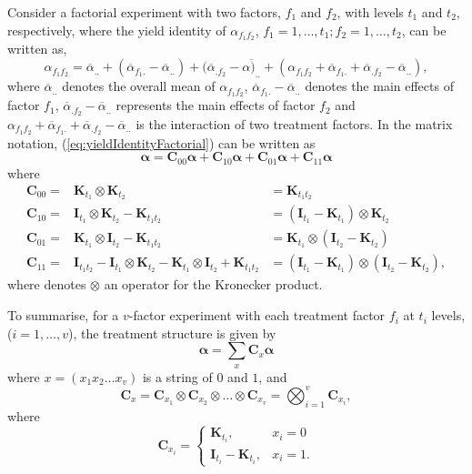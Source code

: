 \documentclass[article]{jss}
\newcommand{\I}{\mathbf{I}}
\newcommand{\K}{\mathbf{K}}
\newcommand{\C}{\mathbf{C}}
\begin{document}
Consider a factorial experiment with two factors, $f_1$ and $f_2$, with levels $t_1$ and $t_2$, respectively, where the yield identity of $\alpha_{f_1 f_2}$, $f_1= 1,\dots, t_1; f_2 = 1,\dots,t_2$, can be written as,
\begin{equation}
\label{eq:yieldIdentityFactorial}
\alpha_{f_1 f_2} = \overline{\alpha}_{..}+(\overline{\alpha}_{f_1 .} -\overline{\alpha}_{..}) + (\overline{\alpha}_{.f_2} -\overline{\alpha)_{..}} +(\alpha_{f_1 f_2} + \overline{\alpha}_{f_1 .} + \overline{\alpha}_{.f_2} -\overline{\alpha}_{..}),
\end{equation}
where $\overline{\alpha}_{..}$ denotes the overall mean of $\alpha_{f_1 f_2}$, $\overline{\alpha}_{f_1.} -\overline{\alpha}_{..}$ denotes the main effects of factor $f_1$, $\overline{\alpha}_{.f_2} -\overline{\alpha}_{..}$ represents the main effects of factor $f_2$ and $\alpha_{f_1 f_2} + \overline{\alpha}_{f_1.} + \overline{\alpha}_{. f_2} -\overline{\alpha}_{..}$ is the interaction of two treatment factors. In the matrix notation, (\ref{eq:yieldIdentityFactorial}) can be written as
\[
\bm{\alpha} =  \C_{00} \bm{\alpha} +   \C_{10} \bm{\alpha} +   \C_{01} \bm{\alpha} +   \C_{11} \bm{\alpha} 
\]
where
\begin{eqnarray}
\nonumber \C_{00} = & \K_{t_1} \otimes \K_{t_2}& = \K_{t_1 t_2}\\
\nonumber \C_{10} = & \I_{t_1} \otimes \K_{t_2} - \K_{t_1 t_2}& = (\I_{t_1} - \K_{t_1}) \otimes \K_{t_2} \\
\nonumber \C_{01} = &\K_{t_1} \otimes \I_{t_2} - \K_{t_1 t_2}& =  \K_{t_1} \otimes (\I_{t_2} - \K_{t_2})\\
\nonumber \C_{11} = &\I_{t_1 t_2}-\I_{t_1} \otimes \K_{t_2} - \K_{t_1} \otimes \I_{t_2} + \K_{t_1 t_2} &= (\I_{t_1} - \K_{t_1}) \otimes (\I_{t_2} - \K_{t_2}),
\end{eqnarray}
where denotes $\otimes$ an operator for the Kronecker product. 

To summarise, for a $v$-factor experiment with each treatment factor $f_i$ at $t_i$ levels, ($i = 1, \dots, v$), the treatment structure is given by 
\begin{equation}
\bm{\alpha} = \sum_x{\C_x\bm{\alpha}}
\end{equation}
where $x = (x_1 x_2 \dots x_{v})$ is a string of $0$ and $1$, and 
\[
\C_x =  \C_{x_1} \otimes  \C_{x_2} \otimes \dots \otimes  \C_{x_{v}} = \bigotimes^{v} _{i = 1} \C_{x_i},
\]
where  
\begin{equation}
\label{eq:contrMat}
 \C_{x_i} =  
   \begin{cases}
       \K_{t_i}, & x_i = 0 \\
       \I_{t_i} - \K_{t_i}, & x_i = 1.
    \end{cases}
\end{equation}
 
\end{document}

